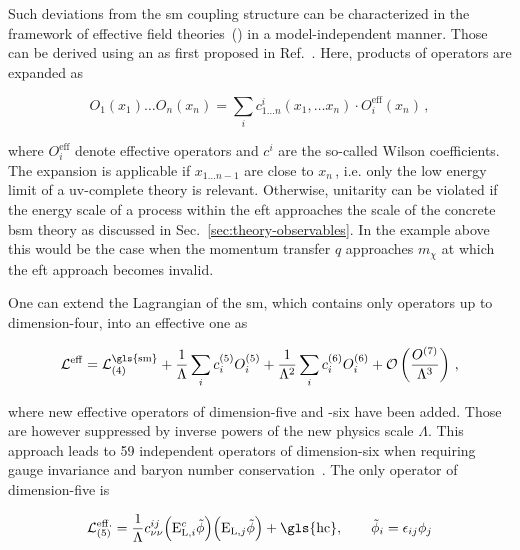 Such deviations from the \gls{sm} coupling structure can be characterized in the framework of effective field theories~() in a model-independent manner. Those can be derived using an  as first proposed in Ref.~\cite{Wilson:1972ee}. Here, products of operators are expanded as

\begin{equation}
{O}_{1}(x_{1})\ldots {O}_{n}(x_{n})=\sum_{i}c_{1\ldots n}^{i}(x_{1},\ldots x_{n})\cdot{O}_{i}^\mathrm{eff}(x_{n})\,,
\end{equation}

where $O_{i}^\mathrm{eff}$ denote effective operators and $c^{i}$ are the so-called Wilson coefficients. The expansion is applicable if $x_{1\ldots n-1}$ are close to $x_n$\,, i.e. only the low energy limit of a \gls{uv}-complete theory is relevant. Otherwise, unitarity can be violated if the energy scale of a process within the \gls{eft} approaches the scale of the concrete \gls{bsm} theory as discussed in Sec.~\ref{sec:theory-observables}. In the example above this would be the case when the momentum transfer $q$ approaches $m_\chi$ at which the \gls{eft} approach becomes invalid.

One can extend the Lagrangian of the \gls{sm}, which contains only operators up to dimension-four, into an effective one as

\begin{equation}
\mathcal{L}^\mathrm{eff}=\mathcal{L}^\mathrm{\gls{sm}}_\mathrm{(4)}+\frac{1}{\Lambda}\sum_{i}c_{i}^\mathrm{(5)}{O}_{i}^\mathrm{(5)}+\frac{1}{\Lambda^{2}}\sum_{i}c_{i}^\mathrm{(6)}{O}_{i}^\mathrm{(6)}+\mathcal{O}\left(\frac{O^\mathrm{(7)}}{\Lambda^3}\right)\,,
\end{equation}

where new effective operators of dimension-five and -six have been added. Those are however suppressed by inverse powers of the new physics scale $\Lambda$. This approach leads to 59 independent operators of dimension-six when requiring gauge invariance and baryon number conservation~\cite{Grzadkowski:2010es}. The only operator of dimension-five is

\begin{equation}
\mathcal{L}^\mathrm{eff.}_\mathrm{(5)}=\frac{1}{\Lambda}c^{ij}_{\nu\nu}\Big({{\mathrm{E}}}^{c}_{\mathrm{L},i}\tilde{\phi}\Big)\Big({\mathrm{E}}_{\mathrm{L},j}\tilde{\phi}\Big)+\mathrm{\gls{hc}},\qquad \tilde{\phi}_{i}=\epsilon_{ij}\phi_{j}
\end{equation}

